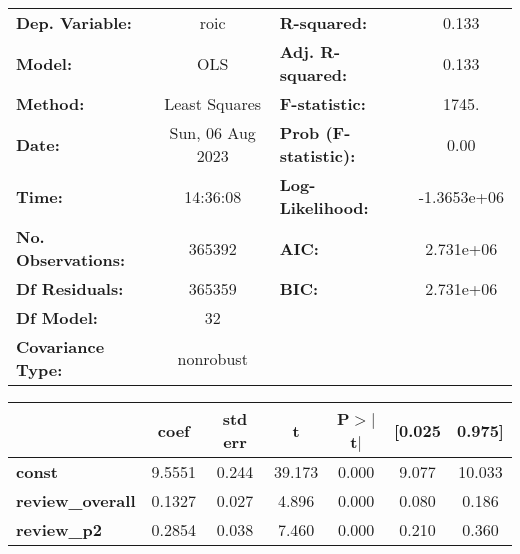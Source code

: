 \begin{center}
\begin{tabular}{lclc}
\toprule
\textbf{Dep. Variable:}                                               &       roic       & \textbf{  R-squared:         } &      0.133   \\
\textbf{Model:}                                                       &       OLS        & \textbf{  Adj. R-squared:    } &      0.133   \\
\textbf{Method:}                                                      &  Least Squares   & \textbf{  F-statistic:       } &      1745.   \\
\textbf{Date:}                                                        & Sun, 06 Aug 2023 & \textbf{  Prob (F-statistic):} &      0.00    \\
\textbf{Time:}                                                        &     14:36:08     & \textbf{  Log-Likelihood:    } & -1.3653e+06  \\
\textbf{No. Observations:}                                            &      365392      & \textbf{  AIC:               } &  2.731e+06   \\
\textbf{Df Residuals:}                                                &      365359      & \textbf{  BIC:               } &  2.731e+06   \\
\textbf{Df Model:}                                                    &          32      & \textbf{                     } &              \\
\textbf{Covariance Type:}                                             &    nonrobust     & \textbf{                     } &              \\
\bottomrule
\end{tabular}
\begin{tabular}{lcccccc}
                                                                      & \textbf{coef} & \textbf{std err} & \textbf{t} & \textbf{P$> |$t$|$} & \textbf{[0.025} & \textbf{0.975]}  \\
\midrule
\textbf{const}                                                        &       9.5551  &        0.244     &    39.173  &         0.000        &        9.077    &       10.033     \\
\textbf{review\_overall}                                              &       0.1327  &        0.027     &     4.896  &         0.000        &        0.080    &        0.186     \\
\textbf{review\_p2}                                                   &       0.2854  &        0.038     &     7.460  &         0.000        &        0.210    &        0.360     \\

\end{tabular}
\end{center}
